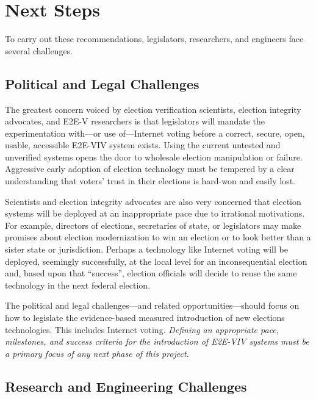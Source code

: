 \section{Next Steps}
\label{sec:next-steps}

To carry out these recommendations, legislators, researchers, and
engineers face several challenges.

\subsection{Political and Legal Challenges}

The greatest concern voiced by election verification scientists,
election integrity advocates, and E2E-V researchers is that
legislators will mandate the experimentation with---or use
of---Internet voting before a correct, secure, open, usable,
accessible E2E-VIV system exists. Using the current untested and
unverified systems opens the door to wholesale election manipulation
or failure. Aggressive early adoption of election technology must be
tempered by a clear understanding that voters' trust in their
elections is hard-won and easily lost.

Scientists and election integrity advocates are also very concerned
that election systems will be deployed at an inappropriate pace due to
irrational motivations. For example, directors of elections,
secretaries of state, or legislators may make promises about election
modernization to win an election or to look better than a sister state
or jurisdiction. Perhaps a technology like Internet voting will be
deployed, seemingly successfully, at the local level for an
inconsequential election and, based upon that ``success'', election
officials will decide to reuse the same technology in the next federal
election.

The political and legal challenges---and related
opportunities---should focus on how to legislate the evidence-based
measured introduction of new elections technologies. This includes
Internet voting. \emph{Defining an appropriate pace, milestones, and
  success criteria for the introduction of E2E-VIV systems must be a
  primary focus of any next phase of this project.}

\subsection{Research and Engineering Challenges}

